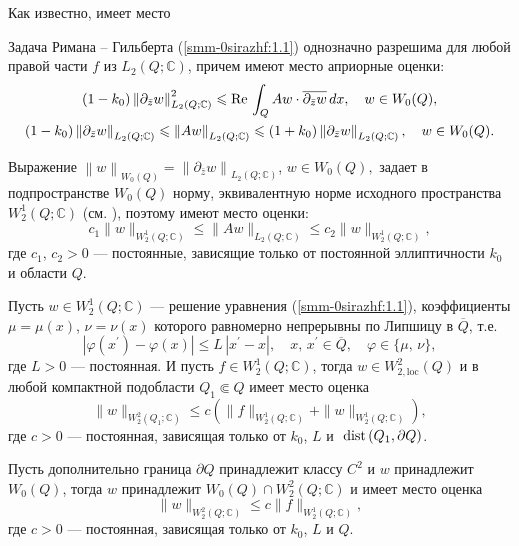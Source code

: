 Как известно, имеет место

\begin{theorem}\label{smm2-th1}
 Задача Римана -- Гильберта {(\ref{smm-0sirazhf:1.1})} однозначно разрешима для любой правой части $f$ из $L_2(Q;\mathbb{C})$,
	причем имеют место априорные оценки:
\begin{gather}\label{smm-0sirazhf:1.3}
	(1-k_0)\left\|\partial_{\bar{z}}w\right\|^2_{L_2(Q;\mathbb{C})}\leqslant \text{Re\,} \int_{Q} Aw\cdot \overline{\partial_{\bar{z}}w}\,dx,\quad w\in W_0(Q),\\
	\label{smm-0sirazhf:1.4}
	(1-k_0)\left\|\partial_{\bar{z}}w\right\|_{L_2(Q;\mathbb{C})}\leqslant \left\| Aw\right\|_{L_2(Q;\mathbb{C})} \leqslant
	(1+k_0)\left\|\partial_{\bar{z}}w\right\|_{L_2(Q;\mathbb{C})}, \quad w\in W_0(Q).
\end{gather}
\end{theorem}
Выражение
$
\left\| w\right\|_{W_0(Q)}=\left\| \partial_{\bar{z}}w\right\|_{L_2(Q;\mathbb{C})}$, $w\in W_0(Q),
$
задает в подпространстве $W_0(Q)$ норму, эквивалентную норме исходного пространства $W_2^1(Q;\mathbb{C})$ (см.  \cite{smm-12,smm-13}),
поэтому имеют место оценки:
\begin{equation}\label{smm-0sirazhf:1.5}
	c_1\|w\|_{W^1_2(Q;\mathbb{C})}\leqslant\|Aw\|_{L_2(Q;\mathbb{C})}\leqslant c_2 \|w\|_{W^1_2(Q;\mathbb{C})},
\end{equation}
где $c_1$, $c_2>0$ --- постоянные, зависящие только от постоянной эллиптичности $k_0$ и области $Q$.

\begin{theorem}\label{smm2-th2} Пусть $w\in W_2^1(Q;\mathbb{C})$ --- решение уравнения  {(\ref{smm-0sirazhf:1.1})}, коэффициенты $\mu=\mu(x)$, $\nu=\nu(x)$ которого равномерно непрерывны по Липшицу в $\overline Q$, т.е.
	$$
	|\varphi(x^\prime)-\varphi(x)|\leqslant L\,|x^\prime-x|,\quad x,\,x^\prime\in \overline{Q},\quad \varphi\in\{\mu,\,\nu\},
	$$
	где $L>0$ --- постоянная. И пусть  $f\in W_2^1(Q;\mathbb{C})$, тогда $w\in W_{2,\text{loc}}^2(Q)$ и в любой компактной подобласти $Q_1\Subset Q$ имеет место оценка
	\begin{equation}\label{smm-0sirazhf:1.6_1}
		\|w\|_{W^2_2(Q_1; \mathbb{C})}\leqslant c\left(\|f\|_{W^1_2(Q; \mathbb{C})}+\|w\|_{W^1_2(Q; \mathbb{C})}\right),
	\end{equation}
	где $c>0$ --- постоянная, зависящая только от $k_0$, $L$ и $\text{ dist\,}(Q_1,\partial Q)$.


Пусть дополнительно граница $\partial Q$ принадлежит классу $C^2$ и $w$ принадлежит $W_0(Q)$, тогда $w$ принадлежит $W_0(Q)\cap W_2^2(Q; \mathbb{C})$ и имеет место оценка
\begin{equation}\label{smm-0sirazhf:1.6_2}
	\|w\|_{W^2_2(Q; \mathbb{C})}\leqslant c\|f\|_{W^1_2(Q; \mathbb{C})},
\end{equation}
где $c>0$ --- постоянная, зависящая только от $k_0$, $L$ и $Q$.
\end{theorem}

